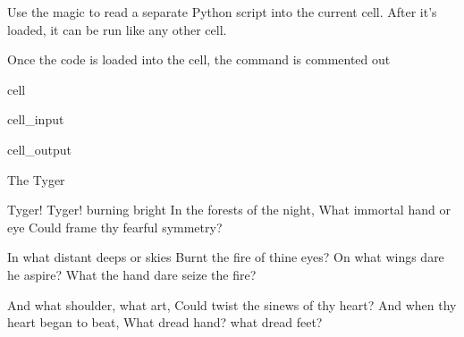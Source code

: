\documentclass[letterpaper,10pt,english]{jupyterBook}
\begin{document}
\sphinxAtStartPar
Use the  magic to read a separate Python script into the current cell. After it’s loaded, it can be run like any other cell.

\sphinxAtStartPar
Once the code is loaded into the cell, the  command is commented out

\begin{sphinxuseclass}{cell}\begin{sphinxVerbatimInput}

\begin{sphinxuseclass}{cell_input}
\begin{sphinxVerbatim}[commandchars=\\\{\}]

      
         
            
\end{sphinxVerbatim}

\end{sphinxuseclass}\end{sphinxVerbatimInput}
\begin{sphinxVerbatimOutput}

\begin{sphinxuseclass}{cell_output}
\begin{sphinxVerbatim}[commandchars=\\\{\}]
           The Tyger

Tyger! Tyger! burning bright
In the forests of the night,
What immortal hand or eye
Could frame thy fearful symmetry?

In what distant deeps or skies
Burnt the fire of thine eyes?
On what wings dare he aspire?
What the hand dare seize the fire?

And what shoulder, \PYGZam{} what art,
Could twist the sinews of thy heart?
And when thy heart began to beat,
What dread hand? \PYGZam{} what dread feet?


\end{sphinxVerbatim}
\end{sphinxuseclass}
\end{sphinxVerbatimOutput}
\end{sphinxuseclass}
\end{document}
